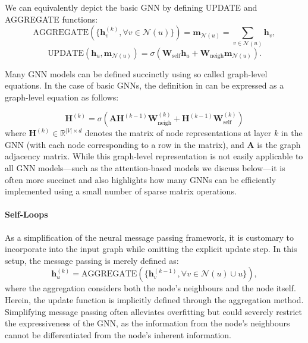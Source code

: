 We can equivalently depict the basic GNN by defining UPDATE and AGGREGATE functions:
\begin{equation*}
    \text{AGGREGATE}(\{\mathbf{h}_v^{(k)}, \forall v \in \mathcal{N}(u)\}) =
    \mathbf{m}_{\mathcal{N}(u)} = \sum_{v\in\mathcal{N}(u)}\mathbf{h}_v,
\end{equation*}
\begin{equation}\label{eq:updateBase}
    \text{UPDATE}(\mathbf{h}_u, \mathbf{m}_{\mathcal{N}(u)}) = \sigma(\mathbf{W}_\text{self}\mathbf{h}_u + \mathbf{W}_\text{neigh}\mathbf{m}_{\mathcal{N}(u)}).
\end{equation}

Many GNN models can be defined succinctly using so called graph-level equations. In the case of basic GNNs, the definition in  can be expressed as a graph-level equation as follows:

\begin{equation}\label{eq:basicGNNgraphlevel}
    \mathbf{H}^{(k)} = \sigma\left(\mathbf{A}\mathbf{H}^{(k-1)}\mathbf{W}_\text{neigh}^{(k)} + \mathbf{H}^{(k-1)}\mathbf{W}_\text{self}^{(k)}\right)
\end{equation}
where $\mathbf{H}^{(k)} \in \mathbb{R}^{|V| \times d}$ denotes the matrix of node representations at layer $k$ in the GNN (with each node corresponding to a row in the matrix), and $\mathbf{A}$ is the graph adjacency matrix. While this graph-level representation is not easily applicable to all GNN models—such as the attention-based models we discuss below—it is often more succinct and also highlights how many GNNs can be efficiently implemented using a small number of sparse matrix operations.


\paragraph{Self-Loops}
As a simplification of the neural message passing framework, it is customary to incorporate  into the input graph while omitting the explicit update step. In this setup, the message passing is merely defined as:
\begin{equation}\label{eq:selfLoop}
    \mathbf{h}_u^{(k)} = \text{AGGREGATE}(\{\mathbf{h}_v^{(k-1)}, \forall v \in \mathcal{N}(u)\cup {u}\}),
\end{equation}
where the aggregation considers both the node's neighbours and the node itself. Herein, the update function is implicitly defined through the aggregation method. Simplifying message passing often alleviates overfitting but could severely restrict the expressiveness of the GNN, as the information from the node's neighbours cannot be differentiated from the node's inherent information.

